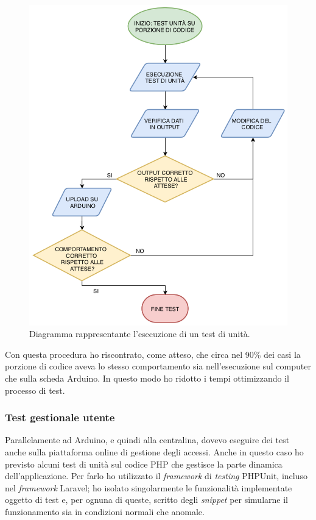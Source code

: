 \begin{figure}[H]
	\begin{center}
	\includegraphics[scale=0.6]{immagini/flow_chart.png}
	\caption{Diagramma rappresentante l'esecuzione di un test di unità.}
	\end{center}
\end{figure}

Con questa procedura ho riscontrato, come atteso, che circa nel 90\% dei casi la porzione di codice aveva lo stesso comportamento sia nell'esecuzione sul computer che sulla scheda Arduino. In questo modo ho ridotto i tempi ottimizzando il processo di test.

\subsubsection{Test gestionale utente}
Parallelamente ad Arduino, e quindi alla centralina, dovevo eseguire dei test anche sulla piattaforma online di gestione degli accessi.
Anche in questo caso ho previsto alcuni test di unità sul codice PHP che gestisce la parte dinamica dell'applicazione. Per farlo ho utilizzato il \textit{framework} di \textit{testing} PHPUnit, incluso nel \textit{framework} Laravel; ho isolato singolarmente le funzionalità implementate oggetto di test e, per ognuna di queste, scritto degli \textit{snippet} per simularne il funzionamento sia in condizioni normali che anomale.

